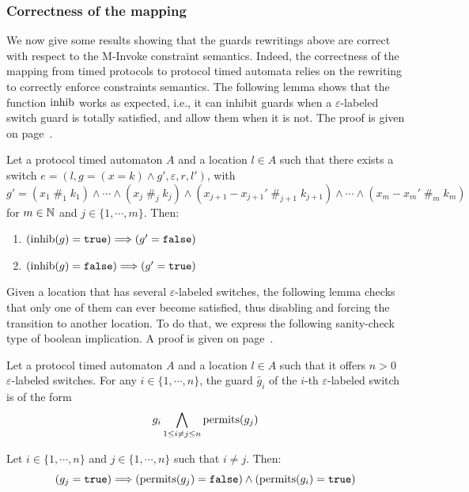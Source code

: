 \subsubsection{Correctness of the mapping}

We now give some results showing that the guards rewritings above are correct with respect to the M-Invoke constraint semantics. Indeed, the correctness of the mapping from timed protocols to protocol timed automata relies on the rewriting to correctly enforce \MInvoke constraints semantics. The following lemma shows that the function $\operatorname{inhib}$ works as expected, i.e., it can inhibit guards when a $\varepsilon$-labeled switch guard is totally satisfied, and allow them when it is not. The proof is given on page~\pageref{proof:inhib}.

\begin{lemma}
Let a protocol timed automaton $A$ and a location $l \in A$ such that there exists a switch $e = (l, g = (x = k) \wedge g', \varepsilon, r, l')$, with
$g' = 
(x_1 \;\#_1\; k_1) \wedge
 \cdots \wedge
 (x_j \;\#_j\; k_j) \wedge
 (x_{j+1} - x_{j+1}' \;\#_{j+1}\; k_{j+1}) \wedge
 \cdots \wedge
 (x_{m} - x_{m}' \;\#_{m}\; k_{m})$ for $m \in \mathbb{N}$ and $j \in \{1, \cdots, m\}$. Then:
\begin{enumerate}

  \item $(\operatorname{inhib}(g) = \mathtt{true}) \Longrightarrow (g' = \mathtt{false})$
  
  \item $(\operatorname{inhib}(g) = \mathtt{false}) \Longrightarrow (g' = \mathtt{true})$

\end{enumerate}
\label{lemma:inhib}
\end{lemma}

Given a location that has several $\varepsilon$-labeled switches, the following lemma checks that only one of them can ever become satisfied, thus disabling and forcing the transition to another location. To do that, we express the following sanity-check type of boolean implication. A proof is given on page~\pageref{proof:permits}.

\begin{lemma}
Let a protocol timed automaton $A$ and a location $l \in A$ such that it offers $n > 0$ $\varepsilon$-labeled switches. For any $i \in \{1, \cdots, n\}$, the guard $\widetilde{g_i}$ of the $i$-th $\varepsilon$-labeled switch is of the form
$$g_i \bigwedge\limits_{1 \leq i \neq j \leq n} \operatorname{permits}(g_j)$$

Let $i \in \{1, \cdots, n \}$ and $j \in \{1, \cdots, n\}$ such that $i \neq j$. Then:
$$
(g_j = \mathtt{true}) \Longrightarrow (\operatorname{permits}(g_j) = \mathtt{false}) \wedge (\operatorname{permits}(g_i) = \mathtt{true})
$$
\label{lemma:permits}
\end{lemma}

